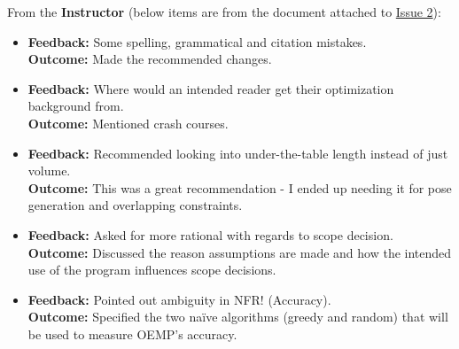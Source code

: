 \documentclass{article}
\begin{document}
From the \textbf{Instructor} (below items are from the document attached to \href{https://github.com/husseinsd1/optimal-em-arrangement/issues/2}{Issue 2}):
\begin{itemize}
    \item \textbf{Feedback: }Some spelling, grammatical and citation mistakes.  \\
    \textbf{Outcome: }Made the recommended changes. 
    \item \textbf{Feedback: }Where would an intended reader get their optimization background from.  \\
    \textbf{Outcome: }Mentioned crash courses. 
    \item \textbf{Feedback: }Recommended looking into under-the-table length instead of just volume.  \\
    \textbf{Outcome: }This was a great recommendation - I ended up needing it for pose generation and overlapping constraints. 
    \item \textbf{Feedback: }Asked for more rational with regards to scope decision.  \\
    \textbf{Outcome: }Discussed the reason assumptions are made and how the intended use of the program influences scope decisions. 
    \item \textbf{Feedback: }Pointed out ambiguity in NFR! (Accuracy).  \\
    \textbf{Outcome: }Specified the two naïve algorithms (greedy and random) that will be used to measure OEMP's accuracy. 
\end{itemize}
\end{document}
